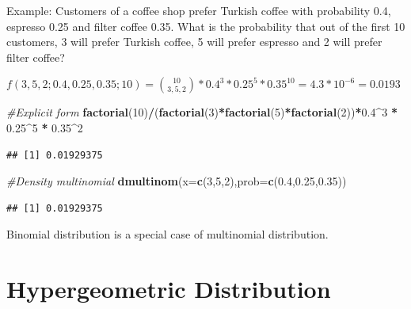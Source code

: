 \documentclass[]{book}
\newenvironment{Shaded}{\begin{snugshade}}{\end{snugshade}}
\newcommand{\CommentTok}[1]{\textcolor[rgb]{0.56,0.35,0.01}{\textit{#1}}}
\newcommand{\DataTypeTok}[1]{\textcolor[rgb]{0.13,0.29,0.53}{#1}}
\newcommand{\DecValTok}[1]{\textcolor[rgb]{0.00,0.00,0.81}{#1}}
\newcommand{\FloatTok}[1]{\textcolor[rgb]{0.00,0.00,0.81}{#1}}
\newcommand{\KeywordTok}[1]{\textcolor[rgb]{0.13,0.29,0.53}{\textbf{#1}}}
\newcommand{\NormalTok}[1]{#1}
\newcommand{\OperatorTok}[1]{\textcolor[rgb]{0.81,0.36,0.00}{\textbf{#1}}}
\newcommand{\StringTok}[1]{\textcolor[rgb]{0.31,0.60,0.02}{#1}}
\theoremstyle{definition}
\theoremstyle{definition}
\theoremstyle{definition}
\theoremstyle{remark}
\begin{document}
Example: Customers of a coffee shop prefer Turkish coffee with
probability 0.4, espresso 0.25 and filter coffee 0.35. What is the
probability that out of the first 10 customers, 3 will prefer Turkish
coffee, 5 will prefer espresso and 2 will prefer filter coffee?

\(f(3,5,2;0.4,0.25,0.35;10) = \binom{10}{3,5,2} * 0.4^3 * 0.25^5 * 0.35^10 = 4.3 * 10^{-6} = 0.0193\)

\begin{Shaded}
\begin{Highlighting}[]
\CommentTok{#Explicit form}
\KeywordTok{factorial}\NormalTok{(}\DecValTok{10}\NormalTok{)}\OperatorTok{/}\NormalTok{(}\KeywordTok{factorial}\NormalTok{(}\DecValTok{3}\NormalTok{)}\OperatorTok{*}\KeywordTok{factorial}\NormalTok{(}\DecValTok{5}\NormalTok{)}\OperatorTok{*}\KeywordTok{factorial}\NormalTok{(}\DecValTok{2}\NormalTok{))}\OperatorTok{*}\FloatTok{0.4}\OperatorTok{^}\DecValTok{3} \OperatorTok{*}\StringTok{ }\FloatTok{0.25}\OperatorTok{^}\DecValTok{5} \OperatorTok{*}\StringTok{ }\FloatTok{0.35}\OperatorTok{^}\DecValTok{2}
\end{Highlighting}
\end{Shaded}

\begin{verbatim}
## [1] 0.01929375
\end{verbatim}

\begin{Shaded}
\begin{Highlighting}[]
\CommentTok{#Density multinomial}
\KeywordTok{dmultinom}\NormalTok{(}\DataTypeTok{x=}\KeywordTok{c}\NormalTok{(}\DecValTok{3}\NormalTok{,}\DecValTok{5}\NormalTok{,}\DecValTok{2}\NormalTok{),}\DataTypeTok{prob=}\KeywordTok{c}\NormalTok{(}\FloatTok{0.4}\NormalTok{,}\FloatTok{0.25}\NormalTok{,}\FloatTok{0.35}\NormalTok{))}
\end{Highlighting}
\end{Shaded}

\begin{verbatim}
## [1] 0.01929375
\end{verbatim}

Binomial distribution is a special case of multinomial distribution.

\hypertarget{hypergeometric-distribution}{%
\section{Hypergeometric
Distribution}\label{hypergeometric-distribution}}
\end{document}
